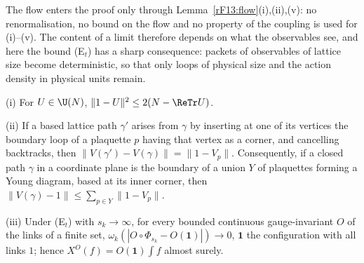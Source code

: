 The flow enters the proof only through Lemma~\ref{rF13:flow}(i),(ii),(v):
no renormalisation, no bound on the flow and no property of the coupling
is used for (i)--(v). The content of a limit therefore depends on what the
observables see, and here the bound (E$_t$) has a sharp consequence:
packets of observables of lattice size become deterministic, so that only
loops of physical size and the action density in physical units remain.

\begin{lemma}\label{rF13:stokes}
\textup{(i)} For $U\in\U(N)$, $\|1-U\|^2\le2(N-\ReTr U)$.

\textup{(ii)} If a based lattice path $\gamma'$ arises from $\gamma$ by
inserting at one of its vertices the boundary loop of a plaquette $p$
having that vertex as a corner, and cancelling backtracks, then
$\|V(\gamma')-V(\gamma)\|=\|1-V_p\|$. Consequently, if a closed path $\gamma$
in a coordinate plane is the boundary of a union $Y$ of plaquettes forming a
Young diagram, based at its inner corner, then $\|V(\gamma)-1\|\le\sum_{p\in
Y}\|1-V_p\|$.

\textup{(iii)} Under \textup{(E$_t$)} with $s_k\to\infty$, for every bounded
continuous gauge-invariant $O$ of the links of a finite set,
$\omega_k(|O\circ\Phi_{s_k}-O(\mathbf 1)|)\to0$, $\mathbf 1$ the configuration
with all links $1$; hence $X^O(f)=O(\mathbf 1)\int f$ almost surely.
\end{lemma}

